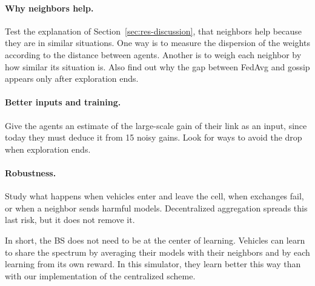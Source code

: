 \paragraph{Why neighbors help.} Test the explanation of Section~\ref{sec:res-discussion}, that neighbors help
because they are in similar situations. One way is to measure the dispersion of the weights according to the
distance between agents. Another is to weigh each neighbor by how similar its situation is. Also find out why
the gap between \ac{FedAvg} and gossip appears only after exploration ends.

\paragraph{Better inputs and training.} Give the agents an estimate of the large-scale gain of their link as an
input, since today they must deduce it from 15 noisy gains. Look for ways to avoid the drop when exploration
ends.

\paragraph{Robustness.} Study what happens when vehicles enter and leave the cell, when exchanges fail, or when
a neighbor sends harmful models. Decentralized aggregation spreads this last risk, but it does not remove it.

\bigskip
\noindent In short, the \ac{BS} does not need to be at the center of learning. Vehicles can learn to share the
spectrum by averaging their models with their neighbors and by each learning from its own reward. In this
simulator, they learn better this way than with our implementation of the centralized scheme.
